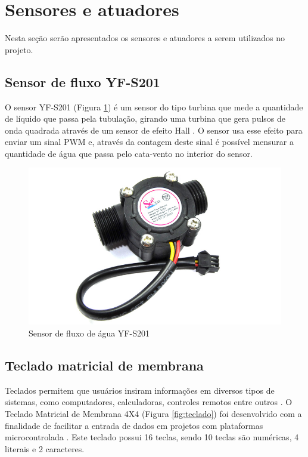\section{Sensores e atuadores}

Nesta seção serão apresentados os sensores e atuadores a serem utilizados no projeto. 

\subsection{Sensor de fluxo YF-S201}

O sensor YF-S201 (Figura \ref{fig:sensor}) é um sensor do tipo turbina que mede a quantidade de líquido que passa pela tubulação, girando uma turbina que
gera pulsos de onda quadrada através de um sensor de efeito Hall \cite{roque2018sistema}. O
sensor usa esse efeito para enviar um sinal PWM e, através da contagem deste sinal é possível mensurar a quantidade de água que passa pelo cata-vento no interior do sensor. \cite{ms2017automaccao}

\begin{figure}[htbp]
		\centering
		\includegraphics[scale=0.3]{figuras/yf-s201.jpg}
		\caption{Sensor de fluxo de água YF-S201}
		\label{fig:sensor}
\end{figure}

\subsection{Teclado matricial de membrana}

Teclados permitem que usuários insiram informações em diversos tipos de sistemas, como computadores, calculadoras, controles remotos entre outros \cite{teclado-matricial-1}. O Teclado Matricial de Membrana 4X4 (Figura \ref{fig:teclado}) foi desenvolvido com a finalidade de facilitar a entrada de dados em projetos com plataformas microcontrolada \cite{teclado-matricial}. Este teclado possui 16 teclas, sendo 10 teclas são numéricas, 4 literais e 2 caracteres.

